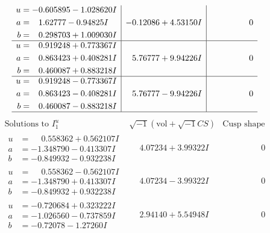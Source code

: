 \documentclass[1p]{elsarticle_modified}
\theoremstyle{definition}
\newcommand{\I}{\sqrt{-1}}
\begin{document}
$$\begin{array}{c|c|c}
\begin{aligned}
u &= -0.605895 - 1.028620 I \\
a &= \phantom{-}1.62777 - 0.94825 I \\
b &= \phantom{-}0.298703 + 1.009030 I\end{aligned}
 & -0.12086 + 4.53150 I & \phantom{-0.000000 } 0 \\ \hline\begin{aligned}
u &= \phantom{-}0.919248 + 0.773367 I \\
a &= \phantom{-}0.863423 + 0.408281 I \\
b &= \phantom{-}0.460087 + 0.883218 I\end{aligned}
 & \phantom{-}5.76777 + 9.94226 I & \phantom{-0.000000 } 0 \\ \hline\begin{aligned}
u &= \phantom{-}0.919248 - 0.773367 I \\
a &= \phantom{-}0.863423 - 0.408281 I \\
b &= \phantom{-}0.460087 - 0.883218 I\end{aligned}
 & \phantom{-}5.76777 - 9.94226 I & \phantom{-0.000000 } 0\\
 \hline 
 \end{array}$$\newpage$$\begin{array}{c|c|c}  
\text{Solutions to }I^u_{1}& \I (\text{vol} + \sqrt{-1}CS) & \text{Cusp shape}\\
 \hline 
\begin{aligned}
u &= \phantom{-}0.558362 + 0.562107 I \\
a &= -1.348790 - 0.413307 I \\
b &= -0.849932 - 0.932238 I\end{aligned}
 & \phantom{-}4.07234 + 3.99322 I & \phantom{-0.000000 } 0 \\ \hline\begin{aligned}
u &= \phantom{-}0.558362 - 0.562107 I \\
a &= -1.348790 + 0.413307 I \\
b &= -0.849932 + 0.932238 I\end{aligned}
 & \phantom{-}4.07234 - 3.99322 I & \phantom{-0.000000 } 0 \\ \hline\begin{aligned}
u &= -0.720684 + 0.323222 I \\
a &= -1.026560 - 0.737859 I \\
b &= -0.72078 - 1.27260 I\end{aligned}
 & \phantom{-}2.94140 + 5.54948 I & \phantom{-0.000000 } 0 \\ \hline\begin{aligned}

\end{aligned}
\end{array}$$
\end{document}
